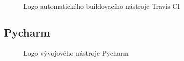 \begin{figure}[bht]
	\centering
	
	\caption{Logo automatického buildovacího nástroje Travis CI}
\end{figure}


\subsection{Pycharm}

\begin{figure}[bht]
	\centering
	
	\caption{Logo vývojového nástroje Pycharm}
\end{figure}

